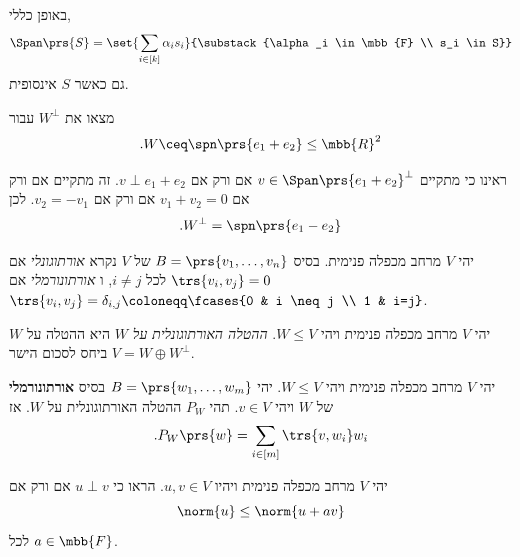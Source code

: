 \documentclass[a4paper,10pt,twoside,openany]{book}
\begin{document}
\begin{remark}
באופן כללי,
\[\Span\prs{S} = \set{\sum_{i \in [k]} \alpha_i s_i}{\substack{\alpha_i \in \mbb{F} \\ s_i \in S}}\]
גם כאשר
$S$
אינסופית.
\end{remark}

\begin{exercisechap}
מצאו את
$W^\perp$
עבור
\[\text{.} W \ceq \spn\prs{e_1 + e_2} \leq \mbb{R}^2\]
\end{exercisechap}

\begin{solution}
ראינו כי מתקיים
$v \in \Span\prs{e_1 + e_2}^\perp$
אם ורק אם
$v \perp e_1 + e_2$.
זה מתקיים
אם ורק אם
$v_1 + v_2 = 0$
אם ורק אם
$v_2 = - v_1$.
לכן
\[\text{.} W^\perp = \spn\prs{e_1 - e_2}\]
\end{solution}

\begin{definition}
יהי
$V$
מרחב מכפלה פנימית.
בסיס
$B = \prs{v_1, \ldots, v_n}$
של
$V$
נקרא
\emph{אורתוגונלי}
אם
$\trs{v_i, v_j} = 0$
לכל
$i \neq j$,
ו%
\emph{אורתונורמלי}
אם
$\trs{v_i, v_j} = \delta_{i,j} \coloneqq \fcases{0 & i \neq j \\ 1 & i=j}$.
\end{definition}

\begin{definition}
יהי
$V$
מרחב מכפלה פנימית ויהי
$W \leq V$.
\emph{ההטלה האורתוגונלית על
$W$}
היא ההטלה על
$W$
ביחס לסכום הישר
$V = W \oplus W^\perp$.
\end{definition}

\begin{proposition}
יהי
$V$
מרחב מכפלה פנימית ויהי
$W \leq V$.
יהי
$B = \prs{w_1, \ldots, w_m}$
בסיס
\textbf{אורתונורמלי}
של
$W$
ויהי
$v \in V$.
תהי
$P_W$
ההטלה האורתוגונלית על
$W$.
אז
\[\text{.} P_W\prs{w} = \sum_{i \in [m]} \trs{v, w_i} w_i\]
\end{proposition}

\begin{exercisechap}
יהי
$V$
מרחב מכפלה פנימית ויהיו
$u,v \in V$.
הראו כי
$u \perp v$
אם ורק אם
\[\norm{u} \leq \norm{u+av}\]
לכל
$a \in \mbb{F}$.
\end{exercisechap}
\end{document}
